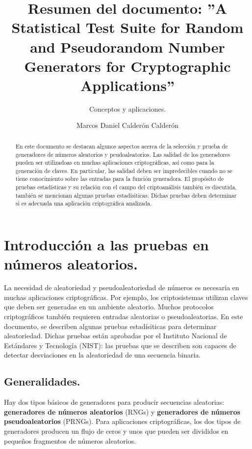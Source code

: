 \documentclass{llncs}
\theoremstyle{plane}
\begin{document}
\title{Resumen  del documento: ''A Statistical Test Suite for Random and Pseudorandom Number Generators for Cryptographic Applications''}



\subtitle{Conceptos y aplicaciones.}


\author{Marcos Daniel Calderón Calderón}





\maketitle

\begin{abstract}
En este documento se destacan algunos aspectos acerca de la selección y prueba de generadores de números aleatorios y peudoaleatorios. Las salidad de los generadores pueden ser utilizadoas en muchas aplicaciones criptográficas, así como para la generación de claves. En particular, las salidad deben ser impredecibles cuando no se tiene conocimiento sobre las entradas para la función generadora. El propósito de pruebas estadísticas y su relación con  el campo del criptoanálisis también es discutida, también se mencionan algunas pruebas estadísiticas. Dichas pruebas deben determinar si es adecuada una aplicación criptográfica analizada.  
\end{abstract}
\section{Introducción a las pruebas en números aleatorios.}

La necesidad de aleatoriedad y pseudoaleatoriedad de números es necesaria en muchas aplicaciones criptográficas. Por ejemplo, los criptosistemas utilizan claves que deben ser generadas en un ambiente aleatorio. Muchos protocolos criptográficos también requieren entradas aleatorias o pseudoaleatorias.
En este documento, se describen algunas pruebas estadísiticas para determinar aleatoriedad. Dichas pruebas están aprobadas por el Instituto Nacional de Estándares y Tecnología (NIST): las pruebas que se describen son capaces de detectar desviaciones en la aleatoriedad de una secuencia binaria.  

\subsection{Generalidades.}
Hay dos tipos básicos de generadores para producir secuencias aleatorias: \textbf{generadores de números aleatorios} (RNGs) y\textbf{ generadores de números pseudoaleatorios} (PRNGs). Para aplicaciones criptográficas, los dos tipos de generadores producen un flujo de ceros y unos que pueden ser divididos en pequeños fragmentos de números aleatorios.
\end{document}
